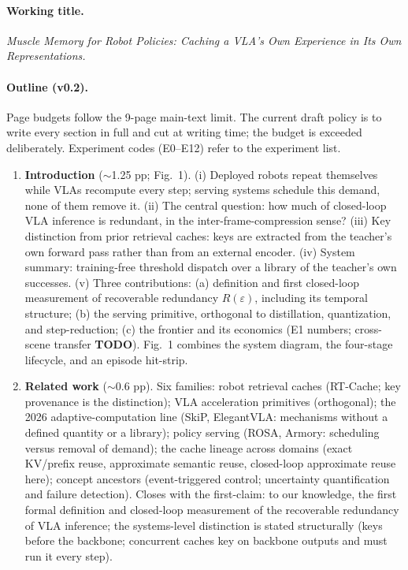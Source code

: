 \documentclass{article}
\newcommand{\TODO}{\colorbox{red!15}{\scriptsize\textbf{TODO}}}
\begin{document}
\paragraph{Working title.}
\emph{Muscle Memory for Robot Policies: Caching a VLA's Own Experience in Its
Own Representations.}

\paragraph{Outline (v0.2).}
Page budgets follow the 9-page main-text limit. The current draft policy is to
write every section in full and cut at writing time; the budget is exceeded
deliberately. Experiment codes (E0--E12) refer to the experiment list.

\begin{enumerate}[leftmargin=1.6em, itemsep=0.5em, topsep=0.3em]
\item \textbf{Introduction} ($\sim$1.25 pp; Fig.~1).
(i) Deployed robots repeat themselves while VLAs recompute every step; serving
systems schedule this demand, none of them remove it.
(ii) The central question: how much of closed-loop VLA inference is redundant,
in the inter-frame-compression sense?
(iii) Key distinction from prior retrieval caches: keys are extracted from the
teacher's own forward pass rather than from an external encoder.
(iv) System summary: training-free threshold dispatch over a library of the
teacher's own successes.
(v) Three contributions: (a) definition and first closed-loop measurement of
recoverable redundancy $R(\varepsilon)$, including its temporal structure;
(b) the serving primitive, orthogonal to distillation, quantization, and
step-reduction; (c) the frontier and its economics (E1 numbers; cross-scene
transfer \TODO). Fig.~1 combines the system diagram, the four-stage lifecycle,
and an episode hit-strip.

\item \textbf{Related work} ($\sim$0.6 pp).
Six families: robot retrieval caches (RT-Cache; key provenance is the
distinction); VLA acceleration primitives (orthogonal); the 2026
adaptive-computation line (SkiP, ElegantVLA: mechanisms without a defined
quantity or a library); policy serving (ROSA, Armory: scheduling versus
removal of demand); the cache lineage across domains (exact KV/prefix reuse,
approximate semantic reuse, closed-loop approximate reuse here); concept
ancestors (event-triggered control; uncertainty quantification and failure
detection). Closes with the first-claim: to our knowledge, the first formal definition
and closed-loop measurement of the recoverable redundancy of VLA inference;
the systems-level distinction is stated structurally (keys before the
backbone; concurrent caches key on backbone outputs and must run it every
step).


\end{enumerate}
\end{document}
